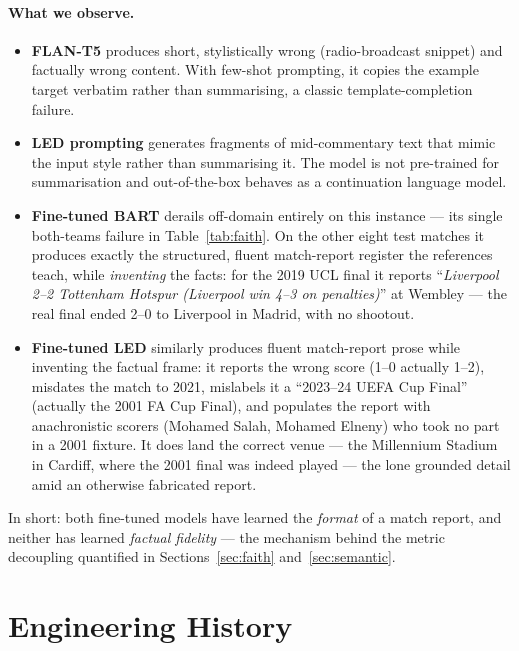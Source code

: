 \documentclass[10pt,a4paper]{article}
\begin{document}
\paragraph{What we observe.}
\begin{itemize}[leftmargin=*,itemsep=2pt,topsep=2pt]
\item \textbf{FLAN-T5} produces short, stylistically wrong (radio-broadcast snippet) and factually wrong content. With few-shot prompting, it copies the example target verbatim rather than summarising, a classic template-completion failure.
\item \textbf{LED prompting} generates fragments of mid-commentary text that mimic the input style rather than summarising it. The model is not pre-trained for summarisation and out-of-the-box behaves as a continuation language model.
\item \textbf{Fine-tuned BART} derails off-domain entirely on this instance --- its single both-teams failure in Table~\ref{tab:faith}. On the other eight test matches it produces exactly the structured, fluent match-report register the references teach, while \emph{inventing} the facts: for the 2019 UCL final it reports ``\emph{Liverpool 2--2 Tottenham Hotspur (Liverpool win 4--3 on penalties)}'' at Wembley --- the real final ended 2--0 to Liverpool in Madrid, with no shootout.
\item \textbf{Fine-tuned LED} similarly produces fluent match-report prose while inventing the factual frame: it reports the wrong score (1--0 actually 1--2), misdates the match to 2021, mislabels it a ``2023--24 UEFA Cup Final'' (actually the 2001 FA Cup Final), and populates the report with anachronistic scorers (Mohamed Salah, Mohamed Elneny) who took no part in a 2001 fixture. It does land the correct venue --- the Millennium Stadium in Cardiff, where the 2001 final was indeed played --- the lone grounded detail amid an otherwise fabricated report.
\end{itemize}

In short: both fine-tuned models have learned the \emph{format} of a match report, and neither has learned \emph{factual fidelity} --- the mechanism behind the metric decoupling quantified in Sections~\ref{sec:faith} and~\ref{sec:semantic}.

\section{Engineering History}
\label{sec:engineering}
\end{document}
